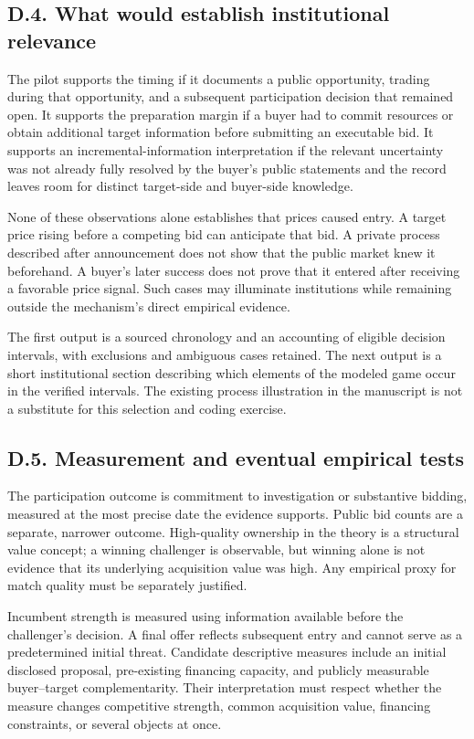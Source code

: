 \documentclass[
  11pt,
]{article}
\begin{document}
\subsection{D.4. What would establish institutional
relevance}\label{oa-d-relevance}

The pilot supports the timing if it documents a public opportunity,
trading during that opportunity, and a subsequent participation decision
that remained open. It supports the preparation margin if a buyer had to
commit resources or obtain additional target information before
submitting an executable bid. It supports an incremental-information
interpretation if the relevant uncertainty was not already fully
resolved by the buyer's public statements and the record leaves room for
distinct target-side and buyer-side knowledge.

None of these observations alone establishes that prices caused entry. A
target price rising before a competing bid can anticipate that bid. A
private process described after announcement does not show that the
public market knew it beforehand. A buyer's later success does not prove
that it entered after receiving a favorable price signal. Such cases may
illuminate institutions while remaining outside the mechanism's direct
empirical evidence.

The first output is a sourced chronology and an accounting of eligible
decision intervals, with exclusions and ambiguous cases retained. The
next output is a short institutional section describing which elements
of the modeled game occur in the verified intervals. The existing
process illustration in the manuscript is not a substitute for this
selection and coding exercise.

\subsection{D.5. Measurement and eventual empirical
tests}\label{oa-d-measurement}

The participation outcome is commitment to investigation or substantive
bidding, measured at the most precise date the evidence supports. Public
bid counts are a separate, narrower outcome. High-quality ownership in
the theory is a structural value concept; a winning challenger is
observable, but winning alone is not evidence that its underlying
acquisition value was high. Any empirical proxy for match quality must
be separately justified.

Incumbent strength is measured using information available before the
challenger's decision. A final offer reflects subsequent entry and
cannot serve as a predetermined initial threat. Candidate descriptive
measures include an initial disclosed proposal, pre-existing financing
capacity, and publicly measurable buyer--target complementarity. Their
interpretation must respect whether the measure changes competitive
strength, common acquisition value, financing constraints, or several
objects at once.
\end{document}
